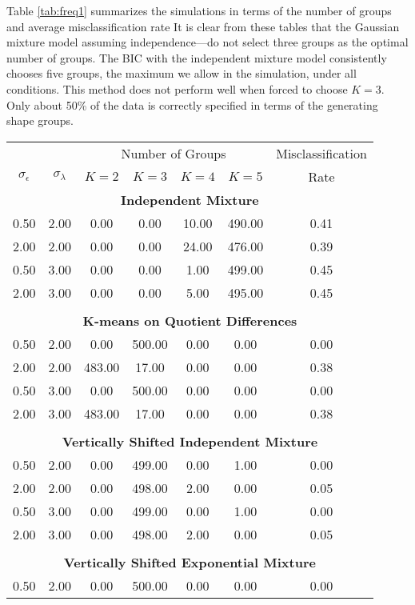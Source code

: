 \documentclass[12pt]{article}
\begin{document}
Table \ref{tab:freq1} summarizes the simulations in terms of the number of groups and average misclassification rate It is clear from these tables that the Gaussian mixture model assuming independence---do not select three groups as the optimal number of groups. The BIC with the independent mixture model consistently chooses five groups, the maximum we allow in the simulation, under all conditions. This method does not perform well when forced to choose $K=3$. Only about 50\% of the data is correctly specified in terms of the generating shape groups.
\begin{table}[ht]
\begin{center}
\begin{tabular}{cc|ccccc}
  \hline &&\multicolumn{4}{c}{Number of Groups}&Misclassification\\ $\sigma_{\epsilon}$&$\sigma_{\lambda}$&$K=2$&$K=3$&$K=4$&$K=5$&Rate\\ \hline\multicolumn{7}{c}{\textbf{Independent Mixture}}\\ 0.50 & 2.00 & 0.00 & 0.00 & 10.00 & 490.00 & 0.41 \\ 
  2.00 & 2.00 & 0.00 & 0.00 & 24.00 & 476.00 & 0.39 \\ 
  0.50 & 3.00 & 0.00 & 0.00 & 1.00 & 499.00 & 0.45 \\ 
  2.00 & 3.00 & 0.00 & 0.00 & 5.00 & 495.00 & 0.45 \\ 
   \\ \multicolumn{7}{c}{\textbf{K-means on Quotient Differences}}\\0.50 & 2.00 & 0.00 & 500.00 & 0.00 & 0.00 & 0.00 \\ 
  2.00 & 2.00 & 483.00 & 17.00 & 0.00 & 0.00 & 0.38 \\ 
  0.50 & 3.00 & 0.00 & 500.00 & 0.00 & 0.00 & 0.00 \\ 
  2.00 & 3.00 & 483.00 & 17.00 & 0.00 & 0.00 & 0.38 \\ 
   \\ \multicolumn{7}{c}{\textbf{Vertically Shifted Independent Mixture}}\\0.50 & 2.00 & 0.00 & 499.00 & 0.00 & 1.00 & 0.00 \\ 
  2.00 & 2.00 & 0.00 & 498.00 & 2.00 & 0.00 & 0.05 \\ 
  0.50 & 3.00 & 0.00 & 499.00 & 0.00 & 1.00 & 0.00 \\ 
  2.00 & 3.00 & 0.00 & 498.00 & 2.00 & 0.00 & 0.05 \\ 
   \\ \multicolumn{7}{c}{\textbf{Vertically Shifted Exponential Mixture}}\\0.50 & 2.00 & 0.00 & 500.00 & 0.00 & 0.00 & 0.00 \\ 

\end{tabular}
\end{center}
\end{table}
\end{document}

